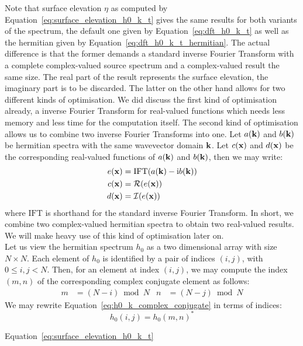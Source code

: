 Note that surface elevation $\eta$ as computed by Equation~\ref{eq:surface_elevation_h0_k_t}
gives the same results for both variants of the spectrum, the default one given by
Equation~\ref{eq:dft_h0_k_t} as well as the hermitian given by Equation~\ref{eq:dft_h0_k_t_hermitian}.
The actual difference is that the former demands a standard inverse Fourier Transform with
a complete complex-valued source spectrum and a complex-valued result the same size. The real part
of the result represents the surface elevation, the imaginary part is to be discarded.
The latter on the other hand allows for two different kinds of optimisation. We did discuss
the first kind of optimisation already, a inverse Fourier Transform for real-valued
functions which needs less memory and less time for the computation itself. The second kind
of optimisation allows us to combine two inverse Fourier Transforms into one. Let $a(\mathbf{k})$
and $b(\mathbf{k})$ be hermitian spectra with the same wavevector domain $\mathbf{k}$. Let $c(\mathbf{x})$
and $d(\mathbf{x})$ be the corresponding real-valued functions of $a(\mathbf{k})$ and $b(\mathbf{k})$,
then we may write:
\begin{align}
 e(\mathbf{x}) &= \mathrm{IFT}(a(\mathbf{k})-\mathrm{i}b(\mathbf{k})) \\
 c(\mathbf{x}) &= \mathcal{R}(e(\mathbf{x})) \\
 d(\mathbf{x}) &= \mathcal{I}(e(\mathbf{x})) 
\end{align}
where $\mathrm{IFT}$ is shorthand for the standard inverse Fourier Transform. In short, we combine
two complex-valued hermitian spectra to obtain two real-valued results. We will make heavy use of
this kind of optimisation later on.\\


Let us view the hermitian spectrum $h_0$ as a two dimensional array with size $N \times N$.
Each element of $h_0$ is identified by a pair of indices $(i,j)$, with $0\leq i,j <N$. Then, for
an element at index $(i,j)$, we may compute the index $(m,n)$ of the corresponding complex
conjugate element as follows:
\begin{align}
m &= (N - i)\bmod N & n &= (N - j)\bmod N
\end{align}
We may rewrite Equation~\ref{eq:h0_k_complex_conjugate} in terms of indices:
\begin{equation}
 h_0(i,j) = h_0(m,n)^*
\end{equation}


Equation~\ref{eq:surface_elevation_h0_k_t}




